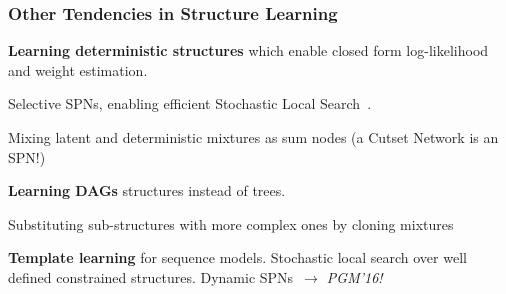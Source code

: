 \documentclass[10pt, t, xcolor={usenames,dvipsnames,svgnames}, compress]{beamer}
\begin{document}
\begin{frame}
  \frametitle{Other Tendencies in Structure Learning}
  \textbf{Learning deterministic structures} which enable closed form
  log-likelihood and weight estimation.\par
  Selective SPNs, enabling efficient Stochastic Local
  Search~\parencite{Peharz2014b}.\par
  Mixing latent and deterministic mixtures as sum
  nodes (a Cutset Network is an
  SPN!)~\parencite{Rahman2016}\par\bigskip
  
  \textbf{Learning DAGs} structures instead of trees.\par
  Substituting sub-structures with more complex ones by cloning mixtures~\parencite{Dennis2015}\par\bigskip
  
  \textbf{Template learning} for sequence
  models.
  Stochastic local search over well defined constrained structures.
  Dynamic SPNs~\parencite{Melibari2016c}\color{gold2}\emph{$\rightarrow$ PGM'16!}\par\bigskip
\end{frame}
\end{document}
